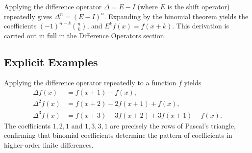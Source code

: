 \begin{remark*}
Applying the difference operator \(\Delta = E - I\) (where \(E\) is the shift
operator) repeatedly gives \(\Delta^n = (E-I)^n\). Expanding by the binomial
theorem yields the coefficients \((-1)^{n-k}\binom{n}{k}\), and \(E^k f(x) = f(x+k)\).
This derivation is carried out in full in the Difference Operators section.
\end{remark*}

\subsection*{Explicit Examples}

\begin{remark*}
Applying the difference operator repeatedly to a function \(f\) yields
\[
\begin{aligned}
\Delta f(x) &= f(x+1)-f(x), \\
\Delta^2 f(x) &= f(x+2)-2f(x+1)+f(x), \\
\Delta^3 f(x) &= f(x+3)-3f(x+2)+3f(x+1)-f(x).
\end{aligned}
\]
The coefficients \(1, 2, 1\) and \(1, 3, 3, 1\) are precisely the rows of
Pascal's triangle, confirming that binomial coefficients determine the pattern
of coefficients in higher-order finite differences.
\end{remark*}
